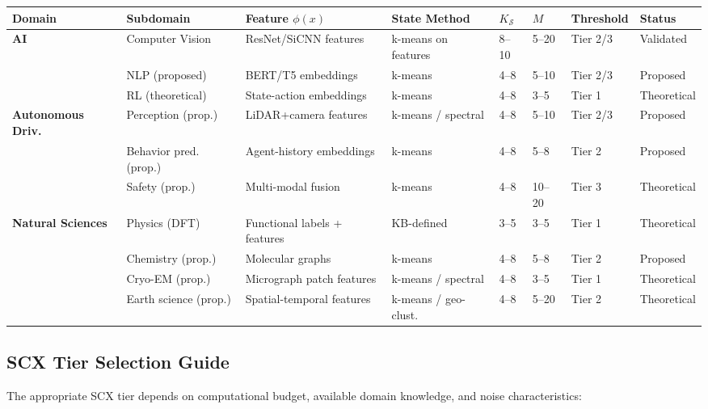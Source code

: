 \documentclass{article}
\begin{document}
\begin{table}[ht]
\centering
\small
\begin{tabular}{llllllll}
\toprule
\textbf{Domain} & \textbf{Subdomain} & \textbf{Feature $\phi(x)$} & \textbf{State Method} & $K_{\mathcal{S}}$ & $M$ & \textbf{Threshold} & \textbf{Status} \\
\midrule
\textbf{AI} & Computer Vision & ResNet/SiCNN features & k-means on features & 8--10 & 5--20 & Tier 2/3 & Validated \\
 & NLP (proposed) & BERT/T5 embeddings & k-means & 4--8 & 5--10 & Tier 2/3 & Proposed \\
 & RL (theoretical) & State-action embeddings & k-means & 4--8 & 3--5 & Tier 1 & Theoretical \\
\midrule
\textbf{Autonomous Driv.} & Perception (prop.) & LiDAR+camera features & k-means / spectral & 4--8 & 5--10 & Tier 2/3 & Proposed \\
 & Behavior pred. (prop.) & Agent-history embeddings & k-means & 4--8 & 5--8 & Tier 2 & Proposed \\
 & Safety (prop.) & Multi-modal fusion & k-means & 4--8 & 10--20 & Tier 3 & Theoretical \\
\midrule
\textbf{Natural Sciences} & Physics (DFT) & Functional labels + features & KB-defined & 3--5 & 3--5 & Tier 1 & Theoretical \\
 & Chemistry (prop.) & Molecular graphs & k-means & 4--8 & 5--8 & Tier 2 & Proposed \\
 & Cryo-EM (prop.) & Micrograph patch features & k-means / spectral & 4--8 & 3--5 & Tier 1 & Theoretical \\
 & Earth science (prop.) & Spatial-temporal features & k-means / geo-clust. & 4--8 & 5--20 & Tier 2 & Theoretical \\
\bottomrule
\end{tabular}
\vspace{0.2cm}
\end{table}

\subsection{SCX Tier Selection Guide}
\label{sec:tier-guide}

The appropriate SCX tier depends on computational budget, available domain knowledge, and noise characteristics:
\end{document}
